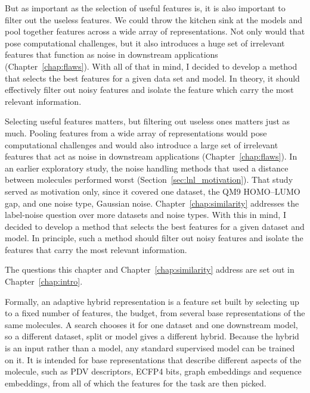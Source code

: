 But as important as the selection of useful features is, it is also important to filter out the useless features. We could throw the kitchen sink at the models and pool together features across a wide array of representations. Not only would that pose computational challenges, but it also introduces a huge set of irrelevant features that function as noise in downstream applications (Chapter~\ref{chap:flaws}). With all of that in mind, I decided to develop a method that selects the best features for a given data set and model. In theory, it should effectively filter out noisy features and isolate the feature which carry the most relevant information.

Selecting useful features matters, but filtering out useless ones matters just as much. Pooling features from a wide array of representations would pose computational challenges and would also introduce a large set of irrelevant features that act as noise in downstream applications (Chapter~\ref{chap:flaws}). In an earlier exploratory study, the noise handling methods that used a distance between molecules performed worst (Section~\ref{sec:lnl_motivation}). That study served as motivation only, since it covered one dataset, the QM9 HOMO--LUMO gap, and one noise type, Gaussian noise. Chapter~\ref{chap:similarity} addresses the label-noise question over more datasets and noise types. With this in mind, I decided to develop a method that selects the best features for a given dataset and model. In principle, such a method should filter out noisy features and isolate the features that carry the most relevant information.

The questions this chapter and Chapter~\ref{chap:similarity} address are set out in Chapter~\ref{chap:intro}.

Formally, an adaptive hybrid representation is a feature set built by selecting up to a fixed number of features, the budget, from several base representations of the same molecules. A search chooses it for one dataset and one downstream model, so a different dataset, split or model gives a different hybrid. Because the hybrid is an input rather than a model, any standard supervised model can be trained on it. It is intended for base representations that describe different aspects of the molecule, such as PDV descriptors, ECFP4 bits, graph embeddings and sequence embeddings, from all of which the features for the task are then picked.

